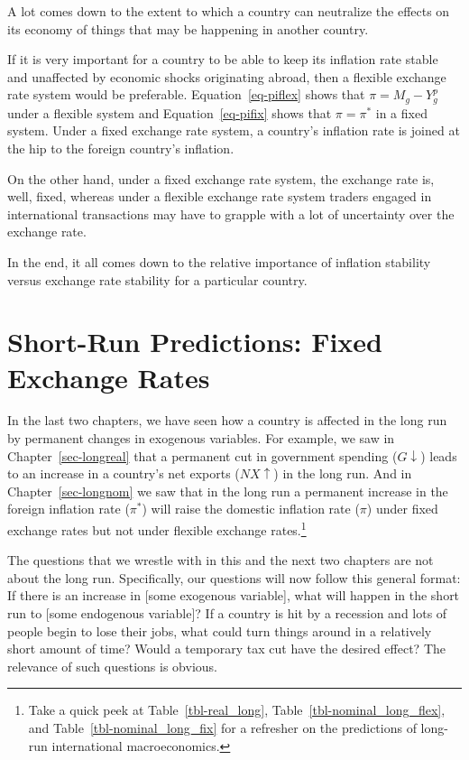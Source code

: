 \documentclass[
  letterpaper,
]{book}
\theoremstyle{plain}
\theoremstyle{remark}
\begin{document}
A lot comes down to the extent to which a country can neutralize the
effects on its economy of things that may be happening in another
country.

If it is very important for a country to be able to keep its inflation
rate stable and unaffected by economic shocks originating abroad, then a
flexible exchange rate system would be preferable.
Equation~\ref{eq-piflex} shows that \(\pi=M_g-Y^p_g\) under a flexible
system and Equation~\ref{eq-pifix} shows that \(\pi=\pi^*\) in a fixed
system. Under a fixed exchange rate system, a country's inflation rate
is joined at the hip to the foreign country's inflation.

On the other hand, under a fixed exchange rate system, the exchange rate
is, well, fixed, whereas under a flexible exchange rate system traders
engaged in international transactions may have to grapple with a lot of
uncertainty over the exchange rate.

In the end, it all comes down to the relative importance of inflation
stability versus exchange rate stability for a particular country.


\chapter{Short-Run Predictions: Fixed Exchange
Rates}\label{sec-short-fixed}

In the last two chapters, we have seen how a country is affected in the
long run by permanent changes in exogenous variables. For example, we
saw in Chapter~\ref{sec-longreal} that a permanent cut in government
spending (\(G\downarrow\)) leads to an increase in a country's net
exports (\(NX\uparrow\)) in the long run. And in
Chapter~\ref{sec-longnom} we saw that in the long run a permanent
increase in the foreign inflation rate (\(\pi^*\)) will raise the
domestic inflation rate (\(\pi\)) under fixed exchange rates but not
under flexible exchange rates.\footnote{Take a quick peek at
  Table~\ref{tbl-real_long}, Table~\ref{tbl-nominal_long_flex}, and
  Table~\ref{tbl-nominal_long_fix} for a refresher on the predictions of
  long-run international macroeconomics.}

The questions that we wrestle with in this and the next two chapters are
not about the long run. Specifically, our questions will now follow this
general format: If there is an increase in {[}some exogenous
variable{]}, what will happen in the short run to {[}some endogenous
variable{]}? If a country is hit by a recession and lots of people begin
to lose their jobs, what could turn things around in a relatively short
amount of time? Would a temporary tax cut have the desired effect? The
relevance of such questions is obvious.
\end{document}
